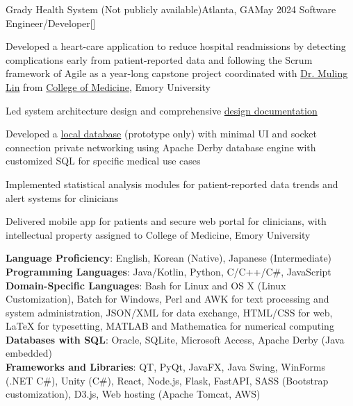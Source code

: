 \begin{resume-itemize}
  {Grady Health System (Not publicly available)}{Atlanta, GA}{May 2024}
  {Software Engineer/Developer}[]
  \item Developed a heart-care application to reduce hospital readmissions by detecting complications early 
  from patient-reported data and following the Scrum framework of Agile as a year-long capstone project coordinated with 
  \href{https://www.doximity.com/pub/muling-lin-md-bec64b54}{Dr. Muling Lin} from 
  \href{https://med.emory.edu/departments/medicine/_documents/resident-photo-book-2022-2023.pdf}{College of Medicine}, Emory University
  \item Led system architecture design and comprehensive 
  \href{https://yundaeleesong.github.io/project2405-server_derbyDB-docs.pdf}{design documentation}
  \item Developed a \href{https://github.com/YundaeLeeSong/ydjs-references/tree/main/project2405-server_derbyDB}{local database}
  (prototype only) with minimal UI and socket connection private networking 
  using Apache Derby database engine with customized SQL for specific medical use cases
  \item Implemented statistical analysis modules for patient-reported data trends and alert systems for clinicians
  \item Delivered mobile app for patients and secure web portal for clinicians, 
  with intellectual property assigned to College of Medicine, Emory University
\end{resume-itemize}
\textbf{Language Proficiency}: English, Korean (Native), Japanese (Intermediate)\\
\textbf{Programming Languages}: Java/Kotlin, Python, C/C++/C\#, JavaScript\\
\textbf{Domain-Specific Languages}: Bash for Linux and OS X (Linux Customization), Batch for Windows, 
Perl and AWK for text processing and system administration, 
JSON/XML for data exchange, 
HTML/CSS for web, LaTeX for typesetting, MATLAB and Mathematica for numerical computing\\
\textbf{Databases with SQL}: Oracle, SQLite, Microsoft Access, Apache Derby (Java embedded)\\
\textbf{Frameworks and Libraries}: QT, PyQt, JavaFX, Java Swing, WinForms (.NET C\#), Unity (C\#), 
React, Node.js, Flask, FastAPI, SASS (Bootstrap customization), D3.js, Web hosting (Apache Tomcat, AWS)\\
